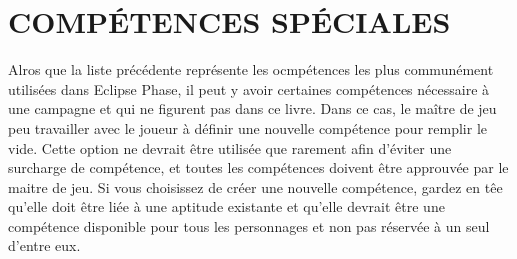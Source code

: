 \section{COMPÉTENCES SPÉCIALES} Alros que la liste précédente représente les ocmpétences les plus communément utilisées dans Eclipse Phase, il peut y avoir certaines compétences nécessaire à une campagne et qui ne figurent pas dans ce livre. Dans ce cas, le maître de jeu peu travailler avec le joueur à définir une nouvelle compétence pour remplir le vide. Cette option ne devrait être utilisée que rarement afin d'éviter une surcharge de compétence, et toutes les compétences doivent être approuvée par le maitre de jeu. Si vous choisissez de créer une nouvelle compétence, gardez en têe qu'elle doit être liée à une aptitude existante et qu'elle devrait être une compétence disponible pour tous les personnages et non pas réservée à un seul d'entre eux. 
















































































